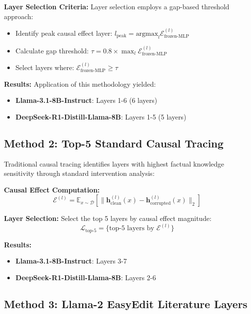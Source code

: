 \textbf{Layer Selection Criteria:}
Layer selection employs a gap-based threshold approach:
\begin{itemize}
    \item Identify peak causal effect layer: $l_{\text{peak}} = \text{argmax}_l \mathcal{E}_{\text{frozen-MLP}}^{(l)}$
    \item Calculate gap threshold: $\tau = 0.8 \times \max_l \mathcal{E}_{\text{frozen-MLP}}^{(l)}$
    \item Select layers where: $\mathcal{E}_{\text{frozen-MLP}}^{(l)} \geq \tau$
\end{itemize}

\textbf{Results:} Application of this methodology yielded:
\begin{itemize}
    \item \textbf{Llama-3.1-8B-Instruct}: Layers 1-6 (6 layers)
    \item \textbf{DeepSeek-R1-Distill-Llama-8B}: Layers 1-5 (5 layers)
\end{itemize}

\subsection{Method 2: Top-5 Standard Causal Tracing}

Traditional causal tracing identifies layers with highest factual knowledge sensitivity through standard intervention analysis:

\textbf{Causal Effect Computation:}
\begin{equation}
\mathcal{E}^{(l)} = \mathbb{E}_{x \sim \mathcal{D}} \left[ \| \mathbf{h}_{\text{clean}}^{(l)}(x) - \mathbf{h}_{\text{corrupted}}^{(l)}(x) \|_2 \right]
\end{equation}

\textbf{Layer Selection:}
Select the top 5 layers by causal effect magnitude:
\begin{equation}
\mathcal{L}_{\text{top-5}} = \{\text{top-5 layers by } \mathcal{E}^{(l)}\}
\end{equation}

\textbf{Results:}
\begin{itemize}
    \item \textbf{Llama-3.1-8B-Instruct}: Layers 3-7
    \item \textbf{DeepSeek-R1-Distill-Llama-8B}: Layers 2-6
\end{itemize}

\subsection{Method 3: Llama-2 EasyEdit Literature Layers}

